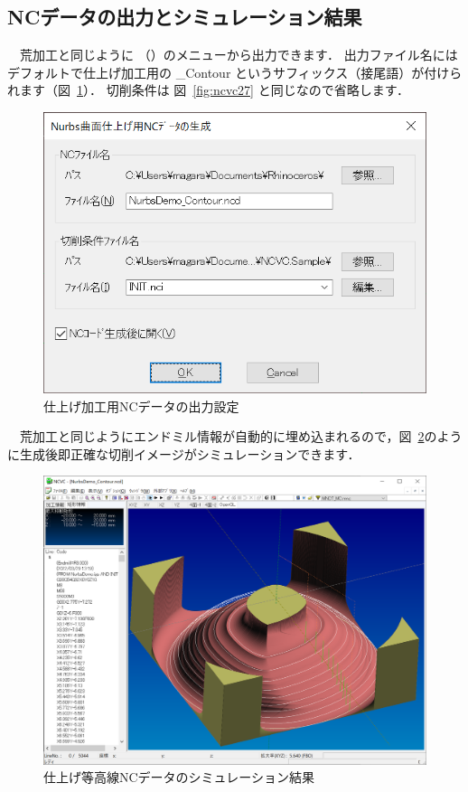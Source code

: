 \newpage
\subsection{NCデータの出力とシミュレーション結果}
　荒加工と同じように （）のメニューから出力できます．
出力ファイル名にはデフォルトで仕上げ加工用の \_Contour というサフィックス（接尾語）が付けられます（図~\ref{fig:ncvc34}）．
切削条件は 図~\ref{fig:ncvc27} と同じなので省略します．

\begin{figure}[H]
\centering
\includegraphics[scale=0.7]{No3/fig/fig34.png}
\caption{仕上げ加工用NCデータの出力設定}
\label{fig:ncvc34}
\end{figure}

　荒加工と同じようにエンドミル情報が自動的に埋め込まれるので，図~\ref{fig:ncvc35}のように生成後即正確な切削イメージがシミュレーションできます．

\begin{figure}[H]
\centering
\includegraphics[scale=0.5]{No3/fig/fig35.png}
\caption{仕上げ等高線NCデータのシミュレーション結果}
\label{fig:ncvc35}
\end{figure}


